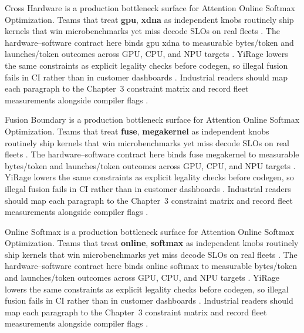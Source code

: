 Cross Hardware is a production bottleneck surface for Attention Online Softmax Optimization. Teams that treat \textbf{gpu}, \textbf{xdna} as independent knobs routinely ship kernels that win microbenchmarks yet miss decode SLOs on real fleets \citep{memoryfloor2026,amd2024xdna}. The hardware--software contract here binds gpu xdna to measurable bytes/token and launches/token outcomes across GPU, CPU, and NPU targets \citep{nvidia2022hopper,amd2024aie}. YiRage lowers the same constraints as explicit legality checks before codegen, so illegal fusion fails in CI rather than in customer dashboards \citep{semianalysis2024tma,dlbook}. Industrial readers should map each paragraph to the Chapter~3 constraint matrix and record fleet measurements alongside compiler flags \citep{amd2024xdna,dao2022flashattention}.

Fusion Boundary is a production bottleneck surface for Attention Online Softmax Optimization. Teams that treat \textbf{fuse}, \textbf{megakernel} as independent knobs routinely ship kernels that win microbenchmarks yet miss decode SLOs on real fleets \citep{nvidia2022hopper,amd2024aie}. The hardware--software contract here binds fuse megakernel to measurable bytes/token and launches/token outcomes across GPU, CPU, and NPU targets \citep{semianalysis2024tma,dlbook}. YiRage lowers the same constraints as explicit legality checks before codegen, so illegal fusion fails in CI rather than in customer dashboards \citep{amd2024xdna,dao2022flashattention}. Industrial readers should map each paragraph to the Chapter~3 constraint matrix and record fleet measurements alongside compiler flags \citep{amd2024aie,kwon2023vllm}.

Online Softmax is a production bottleneck surface for Attention Online Softmax Optimization. Teams that treat \textbf{online}, \textbf{softmax} as independent knobs routinely ship kernels that win microbenchmarks yet miss decode SLOs on real fleets \citep{semianalysis2024tma,dlbook}. The hardware--software contract here binds online softmax to measurable bytes/token and launches/token outcomes across GPU, CPU, and NPU targets \citep{amd2024xdna,dao2022flashattention}. YiRage lowers the same constraints as explicit legality checks before codegen, so illegal fusion fails in CI rather than in customer dashboards \citep{amd2024aie,kwon2023vllm}. Industrial readers should map each paragraph to the Chapter~3 constraint matrix and record fleet measurements alongside compiler flags \citep{dlbook,nvidia2024cudagraphs}.


